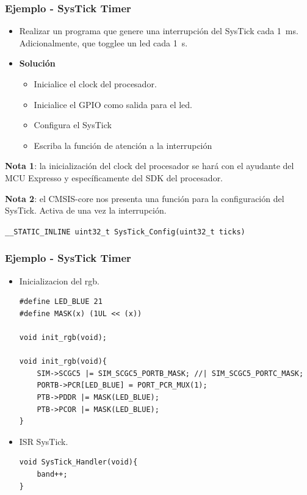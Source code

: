 \documentclass[10.5pt,scale=1.0,t,aspectratio=169,hyperref={pdfpagelabels=false}]{beamer}
\begin{document}
\begin{frame}
	\frametitle{Ejemplo - SysTick Timer }
	{\small
		\begin{itemize}
			\item Realizar un programa que genere una interrupción del SysTick cada \SI{1}{\milli\second}. Adicionalmente, que togglee un led cada \SI{1}{\second}.
			\item \textbf{Solución}
			\begin{itemize}
				\item Inicialice el clock del procesador.
				\item Inicialice el GPIO como salida para el led.
				\item Configura el SysTick
				\item Escriba la función de atención a la interrupción
			\end{itemize}
		\end{itemize}
	
		\textbf{Nota 1}: la inicialización del clock del procesador se hará con el ayudante del MCU Expresso y específicamente del SDK del procesador. 
		
		\textbf{Nota 2}: el CMSIS-core nos presenta una función para la configuración del SysTick. Activa de una vez la interrupción. 
		
		\hspace{2cm} \texttt{\_\_STATIC\_INLINE uint32\_t SysTick\_Config(uint32\_t ticks)}	
	}
\end{frame}

\begin{frame}[fragile]
	\frametitle{Ejemplo - SysTick Timer }
	{\small
		\begin{itemize}
			\item Inicializacion del rgb.
			\begin{lstlisting}[style=CStyle]
#define LED_BLUE 21
#define MASK(x) (1UL << (x))

void init_rgb(void);
				
void init_rgb(void){
	SIM->SCGC5 |= SIM_SCGC5_PORTB_MASK; //| SIM_SCGC5_PORTC_MASK;
	PORTB->PCR[LED_BLUE] = PORT_PCR_MUX(1);
	PTB->PDDR |= MASK(LED_BLUE);
	PTB->PCOR |= MASK(LED_BLUE);
}
			\end{lstlisting}
		\item ISR SysTick.
		\begin{lstlisting}[style=CStyle]
void SysTick_Handler(void){
	band++;
}
		\end{lstlisting}
		\end{itemize}
	}
\end{frame}
\end{document}
